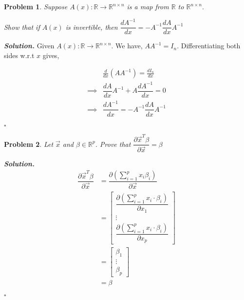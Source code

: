 \documentclass[11pt]{amsart}
\newtheorem{problem}{Problem}
\newenvironment{solution}[1][\it{Solution}]{\textbf{#1. } }{$\square$}
\theoremstyle{definition}
\newcommand{\R}{\mathbb{R}}
\newcommand{\vx}{\vec{x}}
\begin{document}
\begin{problem}
Suppose $A(x): \R\to \R^{n\times n}$ is a map from $\R$ to $\R^{n
\times n}.$ 

Show that if $A(x)$ is invertible, then $
\dfrac{dA^{-1}}{dx}=-A^{-1} \dfrac{dA}{dx} A^{-1}
$
\end{problem}
\begin{solution}
Given $A(x): \R\to \R^{n\times n}$. We have,  $AA^{-1} = I_n$. Differentiating both sides w.r.t $x$ gives,

\begin{align*}
&\frac{d }{dx}\left(AA^{-1}\right) = \frac{d I_n}{dx}\\
\implies &\dfrac{dA}{dx} A^{-1} + A \dfrac{dA^{-1}}{dx} = 0\\
\implies &\boxed{\dfrac{dA^{-1}}{dx}=-A^{-1} \dfrac{dA}{dx} A^{-1}}
\end{align*}



\end{solution}



\begin{problem}
 Let $\vx$ and $\beta\in \R^p$. Prove that 
 $
\dfrac{\partial \vx^T\beta}{\partial \vx}=\beta 
  $
\end{problem}
\begin{solution}
\begin{align*}
\dfrac{\partial \vx^T\beta}{\partial \vx} &= \dfrac{\partial \left(\sum_{i=1}^{p} x_i\beta_i \right)}{\partial \vx}\\
&= \begin{bmatrix}\dfrac{\partial \left( \sum_{i=1}^{p}x_i \cdot \beta_i \right)}{\partial x_1}\\\vdots\\\dfrac{\partial \left( \sum_{i=1}^{p}x_i \cdot \beta_i \right)}{\partial x_p}\end{bmatrix}\\
&= \begin{bmatrix}\beta_1\\\vdots\\ \beta_p\end{bmatrix}\\
&= \boxed{\beta}
\end{align*}

\end{solution}
\end{document}
